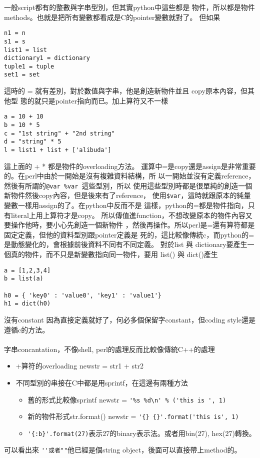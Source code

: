 一般script都有的整數與字串型別，但其實python中這些都是
物件，所以都是物件methods。也就是把所有變數都看成是C的pointer變數就對了。
但如果
\begin{verbatim}
n1 = n
s1 = s
list1 = list
dictionary1 = dictionary
tuple1 = tuple
set1 = set
\end{verbatim}
這時的 = 就有差別，對於數值與字串，他是創造新物件並且 copy原本內容，但其他型
態的就只是pointer指向而已。加上算符又不一樣
\begin{verbatim}
a = 10 + 10
b = 10 * 5
c = "1st string" + "2nd string"
d = "string" * 5
l = list1 + list + ['alibuda']
\end{verbatim}
這上面的 + * 都是物件的overloading方法。
運算中=是copy還是assign是非常重要的。在perl中由於一開始是沒有複雜資料結構，所
以一開始並沒有定義reference，然後有所謂的\verb=@var %var =這些型別，所以
使用這些型別時都是很單純的創造一個新物件然後copy內容，但是後來有了reference，
使用\verb=$var=，這時就跟原本的純量變數一樣用assign的了。在python中反而不是
這樣，python的=都是物件指向，只有literal上用上算符才是copy。
所以傳值進function，不想改變原本的物件內容又要操作他時，要小心先創造一個新物件
，然後再操作。所以perl是=還有算符都是固定定義，但他的資料型別跟pointer定義是
死的，這比較像傳統c，而python的=是動態變化的，會根據前後資料不同有不同定義。
對於list 與 dictionary要產生一個真的物件，而不只是新變數指向同一物件，要用
list() 與 dict()產生
\begin{verbatim}
a = [1,2,3,4]
b = list(a)

h0 = { 'key0' : 'value0', 'key1' : 'value1'}
h1 = dict(h0)
\end{verbatim}
沒有constant
因為直接定義就好了，何必多個保留字constant，但coding style還是遵循c的方法。
\\\\
字串concantation，不像shell, perl的處理反而比較像傳統C++的處理
\begin{itemize}
  \item +算符的overloading newstr = str1 + str2
  \item 不同型別的串接在C中都是用sprintf，在這邊有兩種方法
    \begin{itemize}
      \item 舊的形式比較像sprintf newstr = \verb='%s %d\n' % ('this is ', 1)=
      \item 新的物件形式str.format() newstr = \verb='{} {}'.format('this is', 1)=
      \item \verb='{:b}'.format(27)=表示27的binary表示法。或者用bin(27), 
        hex(27)轉換。
    \end{itemize}
\end{itemize}
可以看出來 \verb=''或者""=他已經是個string object，後面可以直接帶上method的。

